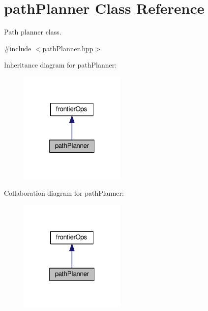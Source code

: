 \hypertarget{classpathPlanner}{}\section{path\+Planner Class Reference}
\label{classpathPlanner}


Path planner class.  




{\ttfamily \#include $<$path\+Planner.\+hpp$>$}



Inheritance diagram for path\+Planner\+:
\nopagebreak
\begin{figure}[H]
\begin{center}
\leavevmode
\includegraphics[width=148pt]{classpathPlanner__inherit__graph}
\end{center}
\end{figure}


Collaboration diagram for path\+Planner\+:
\nopagebreak
\begin{figure}[H]
\begin{center}
\leavevmode
\includegraphics[width=148pt]{classpathPlanner__coll__graph}
\end{center}
\end{figure}
